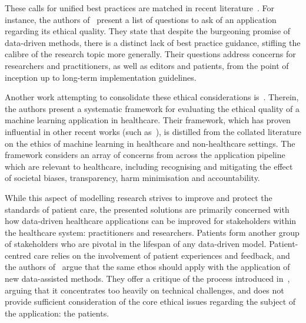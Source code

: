These calls for unified best practices are matched in recent
literature~\cite{Liu2019,Monks2015,Monks2018,Vollmer2020,WitjasPaalberends2017}.
For instance, the authors of~\cite{Vollmer2020} present a list of questions to
ask of an application regarding its ethical quality. They state that despite the
burgeoning promise of data-driven methods, there is a distinct lack of best
practice guidance, stifling the calibre of the research topic more generally.
Their questions address concerns for researchers and practitioners, as well as
editors and patients, from the point of inception up to long-term implementation
guidelines.

Another work attempting to consolidate these ethical considerations
is~\cite{Char2020}. Therein, the authors present a systematic framework for
evaluating the ethical quality of a machine learning application in healthcare.
Their framework, which has proven influential in other recent works (such
as~\cite{Findley2020,Kraft2020}), is distilled from the collated literature on
the ethics of machine learning in healthcare and non-healthcare settings. The
framework considers an array of concerns from across the application pipeline
which are relevant to healthcare, including recognising and mitigating the
effect of societal biases, transparency, harm minimisation and accountability.

While this aspect of modelling research strives to improve and protect the
standards of patient care, the presented solutions are primarily concerned with
how data-driven healthcare applications can be improved for stakeholders within
the healthcare system: practitioners and researchers. Patients form another
group of stakeholders who are pivotal in the lifespan of any data-driven
model. Patient-centred care relies on the involvement of patient experiences and
feedback, and the authors of~\cite{Findley2020} argue that the same ethos should
apply with the application of new data-assisted methods. They offer a critique
of the process introduced in~\cite{Char2020}, arguing that it concentrates too
heavily on technical challenges, and does not provide sufficient consideration
of the core ethical issues regarding the subject of the application: the
patients.

